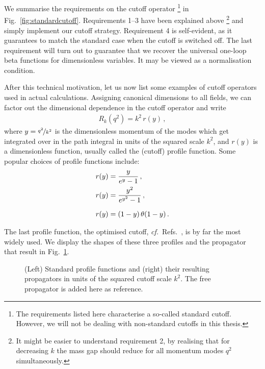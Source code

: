\documentclass[11pt]{book}
\newcommand\cf{\textit{cf.}\ }
\numberwithin{equation}{chapter}
\begin{document}
\noindent
We summarise the requirements on the cutoff operator%
\footnote{%
  The requirements listed here characterise a so-called
  standard cutoff. However, we will not be dealing with
  non-standard cutoffs in this thesis.
}
in Fig.~\ref{fig:standardcutoff}. Requirements 1--3
have been explained above%
\footnote{%
  It might be easier to understand requirement 2, by realising
  that for decreasing $k$ the mass gap should reduce for all
  momentum modes $q^2$ simultaneously.
}
and simply implement our cutoff strategy. Requirement 4
is self-evident, as it guarantees to match the standard case when the
cutoff is switched off. The last requirement will turn out to guarantee that
we recover the universal one-loop beta functions for dimensionless
variables. It may be viewed as a normalisation condition.

After this technical motivation, let us now list some examples of
cutoff operators used in actual calculations. Assigning canonical
dimensions to all fields, we can factor out the dimensional
dependence in the cutoff operator and write
\begin{align}
  R_k(q^2) = k^2 \, r(y) \,,
\end{align}
where $y=\nicefrac{q^2}{k^2}$ is the dimensionless momentum
of the modes which get integrated over in the path integral
in units of the squared scale $k^2$, and $r(y)$ is a dimensionless
function, usually called the (cutoff) profile function.
Some popular choices of profile functions include:
\begin{align}
  r(y) &= \frac{ y }{ e^y - 1} \,, \\
  r(y) &= \frac{ y^2 }{ e^{y^2} - 1} \,, \\
  r(y) &= \vphantom{ \frac{ y^2 }{ e^{y^2} - 1} } (1-y) \, \theta(1-y) \,.
\end{align}
The last profile function,
the optimised cutoff, \cf Refs.~\cite{Litim:2000ci,Litim:2001up},
is by far the most widely used.
We display the shapes of these three profiles and the propagator that
result in Fig.~\ref{fig:profiles}.

\begin{figure}
  \begin{center}
    
  \end{center}
  \caption{
    (Left) Standard profile functions and
    (right) their resulting propagators in units of
    the squared cutoff scale $k^2$.
    The free propagator is added here as reference.
  }
  \label{fig:profiles}
\end{figure}
\end{document}
